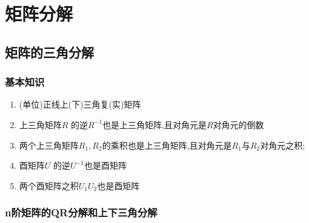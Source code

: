 \section{矩阵分解}

\subsection{矩阵的三角分解}
\subsubsection{基本知识}
 \begin{enumerate}
\item (单位)正线上(下)三角复(实)矩阵
\item 上三角矩阵$R$ 的逆$R^{-1}$也是上三角矩阵,且对角元是$R$对角元的倒数
\item 两个上三角矩阵$R_1,R_2$的乘积也是上三角矩阵,且对角元是$R_1$与$R_2$对角元之积;
\item	酉矩阵$U$ 的逆$U^{-1}$也是酉矩阵
\item 两个酉矩阵之积$U_1U_2$也是酉矩阵
\end{enumerate}


\subsubsection{n阶矩阵的QR分解和上下三角分解}

